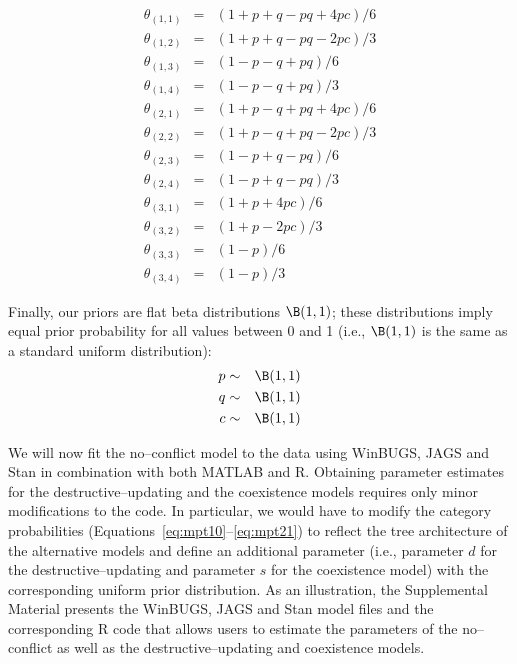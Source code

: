 \begin{eqnarray} 
\theta_{(1,1)} &=& (1+p+q-pq+4pc)/6\label{eq:mpt10}\\
\theta_{(1,2)} &=& ( 1 + p + q - pq - 2pc ) / 3\label{eq:mpt11}\\
\theta_{(1,3)} &=& ( 1 - p - q + pq ) / 6\label{eq:mpt12}\\
\theta_{(1,4)} &=& ( 1 - p - q + pq ) / 3\label{eq:mpt13}\\
\theta_{(2,1)} &=& ( 1 + p - q + pq + 4pc ) / 6\label{eq:mpt14}\\
\theta_{(2,2)} &=& ( 1 + p - q + pq - 2pc ) / 3\label{eq:mpt15}\\
\theta_{(2,3)} &=& ( 1 - p + q - pq ) / 6\label{eq:mpt16}\\
\theta_{(2,4)} &=& ( 1 - p + q - pq ) / 3\label{eq:mpt17}\\
\theta_{(3,1)} &=& ( 1 + p + 4pc ) / 6\label{eq:mpt18}\\
\theta_{(3,2)} &=& ( 1 + p - 2pc ) / 3\label{eq:mpt19}\\
\theta_{(3,3)} &=& ( 1 - p ) / 6\label{eq:mpt20}\\
\theta_{(3,4)} &=& ( 1 - p ) / 3\label{eq:mpt21}
\end{eqnarray}

\noindent Finally, our priors are flat beta distributions $\B(1,1)$; these distributions imply equal prior probability for all values between 0 and 1 (i.e., $\B(1,1)$ is the same as a standard uniform distribution):
\begin{eqnarray}
p &\sim& \B(1,1)\label{eq:mpt22}\\
q &\sim& \B(1,1)\label{eq:mpt23}\\
c &\sim& \B(1,1)\label{eq:mpt24}
\end{eqnarray}

We will now fit the no--conflict model to the  data using WinBUGS, JAGS and Stan in combination with both MATLAB and R. Obtaining parameter estimates for the destructive--updating and the coexistence models requires only minor modifications to the code. {In particular, we would have to modify the category probabilities (Equations~\ref{eq:mpt10}--\ref{eq:mpt21}) to reflect the tree architecture of the alternative models and define an additional parameter (i.e., parameter $d$ for the destructive--updating and parameter $s$ for the coexistence model) with the corresponding uniform prior distribution. As an illustration, the Supplemental Material presents the WinBUGS, JAGS and Stan model files and the corresponding R code that allows users to estimate the parameters of the no--conflict as well as the destructive--updating and coexistence models.}



